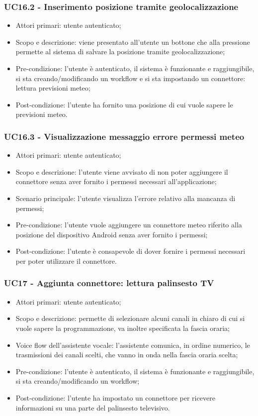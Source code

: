 \subsubsection{UC16.2 - Inserimento posizione tramite geolocalizzazione}
\begin{itemize}
	\item  Attori primari: utente autenticato;
	\item  Scopo e descrizione: viene presentato all'utente un bottone che alla pressione permette al sistema di salvare la posizione tramite geolocalizzazione;
	\item  Pre-condizione: l'utente è autenticato, il sistema è funzionante e raggiungibile, si sta creando/modificando un workflow e si sta impostando un connettore: lettura previsioni meteo;
	\item  Post-condizione: l'utente ha fornito una posizione di cui vuole sapere le previsioni meteo.
\end{itemize}
\subsubsection{UC16.3 - Visualizzazione messaggio errore permessi meteo}
\begin{itemize}
	\item  Attori primari: utente autenticato;
	\item  Scopo e descrizione: l'utente viene avvisato di non poter aggiungere il connettore senza aver fornito i permessi necessari all'applicazione;
	\item  Scenario principale: l'utente visualizza l'errore relativo alla mancanza di permessi;
	\item  Pre-condizione: l'utente vuole aggiungere un connettore meteo riferito alla posizione del dispositivo Android senza aver fornito i permessi;
	\item  Post-condizione: l'utente è consapevole di dover fornire i permessi necessari per poter utilizzare il connettore.
\end{itemize}
\subsubsection{UC17 - Aggiunta connettore: lettura palinsesto TV}
\begin{itemize}
	\item  Attori primari: utente autenticato;
	\item  Scopo e descrizione: permette di selezionare alcuni canali in chiaro di cui si vuole sapere la programmazione, va inoltre specificata la fascia oraria;
	\item  Voice flow dell'assistente vocale: l'assistente comunica, in ordine numerico, le trasmissioni dei canali scelti, che vanno in onda nella fascia oraria scelta;
	\item  Pre-condizione: l'utente è autenticato, il sistema è funzionante e raggiungibile, si sta creando/modificando un workflow;
	\item  Post-condizione: l'utente ha impostato un connettore per ricevere informazioni su una parte del palinsesto televisivo.
\end{itemize}
